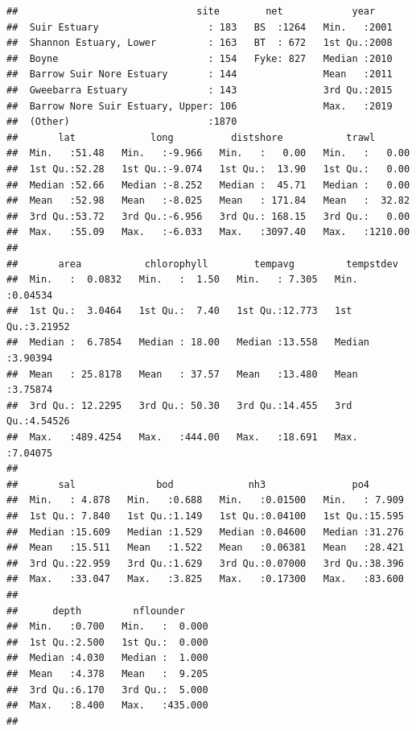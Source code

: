 \documentclass[
]{article}
\begin{document}
\begin{verbatim}
##                               site        net            year     
##  Suir Estuary                   : 183   BS  :1264   Min.   :2001  
##  Shannon Estuary, Lower         : 163   BT  : 672   1st Qu.:2008  
##  Boyne                          : 154   Fyke: 827   Median :2010  
##  Barrow Suir Nore Estuary       : 144               Mean   :2011  
##  Gweebarra Estuary              : 143               3rd Qu.:2015  
##  Barrow Nore Suir Estuary, Upper: 106               Max.   :2019  
##  (Other)                        :1870                             
##       lat             long          distshore           trawl        
##  Min.   :51.48   Min.   :-9.966   Min.   :   0.00   Min.   :   0.00  
##  1st Qu.:52.28   1st Qu.:-9.074   1st Qu.:  13.90   1st Qu.:   0.00  
##  Median :52.66   Median :-8.252   Median :  45.71   Median :   0.00  
##  Mean   :52.98   Mean   :-8.025   Mean   : 171.84   Mean   :  32.82  
##  3rd Qu.:53.72   3rd Qu.:-6.956   3rd Qu.: 168.15   3rd Qu.:   0.00  
##  Max.   :55.09   Max.   :-6.033   Max.   :3097.40   Max.   :1210.00  
##                                                                      
##       area           chlorophyll        tempavg         tempstdev      
##  Min.   :  0.0832   Min.   :  1.50   Min.   : 7.305   Min.   :0.04534  
##  1st Qu.:  3.0464   1st Qu.:  7.40   1st Qu.:12.773   1st Qu.:3.21952  
##  Median :  6.7854   Median : 18.00   Median :13.558   Median :3.90394  
##  Mean   : 25.8178   Mean   : 37.57   Mean   :13.480   Mean   :3.75874  
##  3rd Qu.: 12.2295   3rd Qu.: 50.30   3rd Qu.:14.455   3rd Qu.:4.54526  
##  Max.   :489.4254   Max.   :444.00   Max.   :18.691   Max.   :7.04075  
##                                                                        
##       sal              bod             nh3               po4        
##  Min.   : 4.878   Min.   :0.688   Min.   :0.01500   Min.   : 7.909  
##  1st Qu.: 7.840   1st Qu.:1.149   1st Qu.:0.04100   1st Qu.:15.595  
##  Median :15.609   Median :1.529   Median :0.04600   Median :31.276  
##  Mean   :15.511   Mean   :1.522   Mean   :0.06381   Mean   :28.421  
##  3rd Qu.:22.959   3rd Qu.:1.629   3rd Qu.:0.07000   3rd Qu.:38.396  
##  Max.   :33.047   Max.   :3.825   Max.   :0.17300   Max.   :83.600  
##                                                                     
##      depth         nflounder      
##  Min.   :0.700   Min.   :  0.000  
##  1st Qu.:2.500   1st Qu.:  0.000  
##  Median :4.030   Median :  1.000  
##  Mean   :4.378   Mean   :  9.205  
##  3rd Qu.:6.170   3rd Qu.:  5.000  
##  Max.   :8.400   Max.   :435.000  
## 
\end{verbatim}
\end{document}

